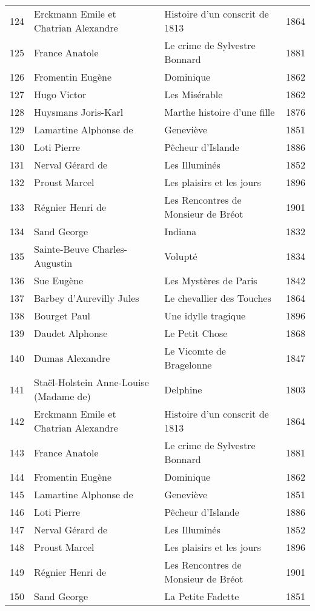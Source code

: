 \begin{table}[H]
\begin{tabular}{l l l l}
    124 & Erckmann Emile et Chatrian Alexandre & Histoire d’un conscrit de 1813 & 1864 \\
    125 & France Anatole & Le crime de Sylvestre Bonnard & 1881 \\
    126 & Fromentin Eugène & Dominique & 1862 \\
    127 & Hugo Victor & Les Misérable & 1862 \\
    128 & Huysmans Joris-Karl & Marthe histoire d’une fille & 1876 \\
    129 & Lamartine Alphonse de & Geneviève & 1851 \\
    130 & Loti Pierre & Pêcheur d’Islande & 1886 \\
    131 & Nerval Gérard de & Les Illuminés & 1852 \\
    132 & Proust Marcel & Les plaisirs et les jours & 1896 \\
    133 & Régnier Henri de & Les Rencontres de Monsieur de Bréot & 1901 \\
    134 & Sand George & Indiana & 1832 \\
    135 & Sainte-Beuve Charles-Augustin & Volupté & 1834 \\
    136 & Sue Eugène & Les Mystères de Paris & 1842 \\
    137 & Barbey d'Aurevilly Jules & Le chevallier des Touches & 1864 \\
    138 & Bourget Paul & Une idylle tragique & 1896 \\
    139 & Daudet Alphonse & Le Petit Chose & 1868 \\
    140 & Dumas Alexandre & Le Vicomte de Bragelonne & 1847 \\
    141 & Staël-Holstein Anne-Louise (Madame de) & Delphine & 1803 \\
    142 & Erckmann Emile et Chatrian Alexandre & Histoire d’un conscrit de 1813 & 1864 \\
    143 & France Anatole & Le crime de Sylvestre Bonnard & 1881 \\
    144 & Fromentin Eugène & Dominique & 1862 \\
    145 & Lamartine Alphonse de & Geneviève & 1851 \\
    146 & Loti Pierre & Pêcheur d’Islande & 1886 \\
    147 & Nerval Gérard de & Les Illuminés & 1852 \\
    148 & Proust Marcel & Les plaisirs et les jours & 1896 \\
    149 & Régnier Henri de & Les Rencontres de Monsieur de Bréot & 1901 \\
    150 & Sand George & La Petite Fadette & 1851 \\
    \bottomrule
  \end{tabular}
\end{table}

